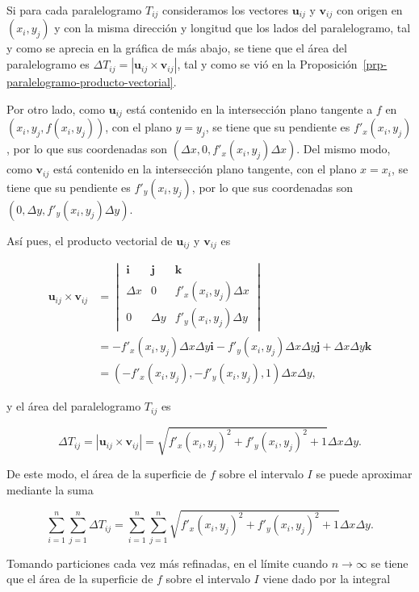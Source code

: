 \documentclass[
  a4paper,
]{scrreport}
\theoremstyle{plain}
\theoremstyle{definition}
\theoremstyle{plain}
\theoremstyle{plain}
\theoremstyle{definition}
\theoremstyle{definition}
\theoremstyle{remark}
\begin{document}
Si para cada paralelogramo \(T_{ij}\) consideramos los vectores
\(\mathbf{u}_{ij}\) y \(\mathbf{v}_{ij}\) con origen en \((x_i, y_j)\) y
con la misma dirección y longitud que los lados del paralelogramo, tal y
como se aprecia en la gráfica de más abajo, se tiene que el área del
paralelogramo es
\(\Delta T_{ij} = |\mathbf{u}_{ij}\times\mathbf{v}_{ij}|\), tal y como
se vió en la Proposición~\ref{prp-paralelogramo-producto-vectorial}.

Por otro lado, como \(\mathbf{u}_{ij}\) está contenido en la
intersección plano tangente a \(f\) en \((x_i,y_j,f(x_i,y_j))\), con el
plano \(y=y_j\), se tiene que su pendiente es \(f'_x(x_i,y_j)\), por lo
que sus coordenadas son \((\Delta x, 0, f'_x(x_i,y_j)\Delta x)\). Del
mismo modo, como \(\mathbf{v}_{ij}\) está contenido en la intersección
plano tangente, con el plano \(x=x_i\), se tiene que su pendiente es
\(f'_y(x_i,y_j)\), por lo que sus coordenadas son
\((0, \Delta y, f'_y(x_i,y_j)\Delta y)\).

Así pues, el producto vectorial de \(\mathbf{u}_{ij}\) y
\(\mathbf{v}_{ij}\) es

\begin{align*}
\mathbf{u}_{ij}\times\mathbf{v}_{ij} 
&= 
\begin{vmatrix}
\mathbf{i} & \mathbf{j} & \mathbf{k} \\
\Delta x & 0 & f'_x(x_i,y_j)\Delta x \\
0 & \Delta y & f'_y(x_i,y_j)\Delta y
\end{vmatrix} \\
&= -f'_x(x_i,y_j)\Delta x\Delta y \mathbf{i} -f'_y(x_i,y_j)\Delta x\Delta y \mathbf{j} + \Delta x\Delta y \mathbf{k} \\
&= (-f'_x(x_i,y_j), -f'_y(x_i,y_j), 1)\Delta x\Delta y,
\end{align*}

y el área del paralelogramo \(T_{ij}\) es

\[
\Delta T_{ij} 
= |\mathbf{u}_{ij}\times\mathbf{v}_{ij}| 
= \sqrt{f'_x(x_i,y_j)^2 + f'_y(x_i,y_j)^2 + 1}\Delta x\Delta y.
\]

De este modo, el área de la superficie de \(f\) sobre el intervalo \(I\)
se puede aproximar mediante la suma

\[
\sum_{i=1}^n\sum_{j=1}^n \Delta T_{ij} 
= \sum_{i=1}^n\sum_{j=1}^n \sqrt{f'_x(x_i,y_j)^2 + f'_y(x_i,y_j)^2 + 1}\Delta x\Delta y.
\]

Tomando particiones cada vez más refinadas, en el límite cuando
\(n\to \infty\) se tiene que el área de la superficie de \(f\) sobre el
intervalo \(I\) viene dado por la integral
\end{document}

